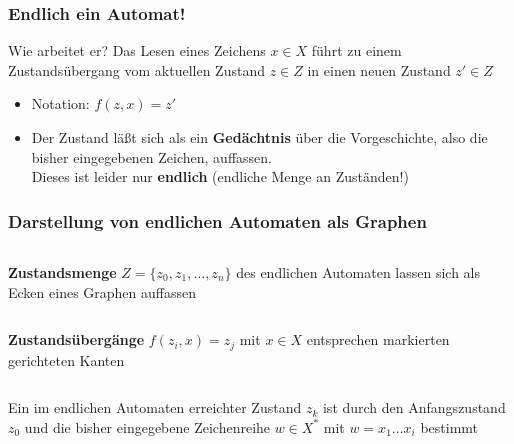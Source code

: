 \begin{frame}
  \frametitle{Endlich ein Automat!}

  \begin{block}{Wie arbeitet er?}
    Das Lesen eines Zeichens $x \in X$ führt zu einem Zustandsübergang vom
    aktuellen Zustand $z \in Z$ in einen neuen Zustand $z' \in Z$
    \begin{itemize}
      \item Notation: $f(z,x)=z'$
      \item Der Zustand läßt sich als ein \textbf{Gedächtnis} über die
        Vorgeschichte, also die bisher eingegebenen Zeichen, auffassen.\\
        Dieses ist leider nur \textbf{endlich} (endliche Menge an Zuständen!)
    \end{itemize}
  \end{block}
\end{frame}

\begin{frame}
  \frametitle{Darstellung von endlichen Automaten als Graphen}

  \begin{columns}
    \textbf{Zustandsmenge} $Z = \{z_0, z_1, \ldots, z_n\}$ des endlichen Automaten
      lassen sich als Ecken eines Graphen auffassen
    \\
  \end{columns}
  \pause
  \vspace{2em}

  \begin{columns}
    \textbf{Zustandsübergänge} $f(z_i,x)=z_j$ mit $x \in X$ entsprechen
      markierten gerichteten Kanten
  \end{columns}
  \pause
  \vspace{2em}

  Ein im endlichen Automaten erreichter Zustand $z_k$ ist durch den
  Anfangszustand $z_0$ und die bisher eingegebene Zeichenreihe $w \in X^*$ mit
  $w = x_1\ldots x_i$ bestimmt \\
\end{frame}

